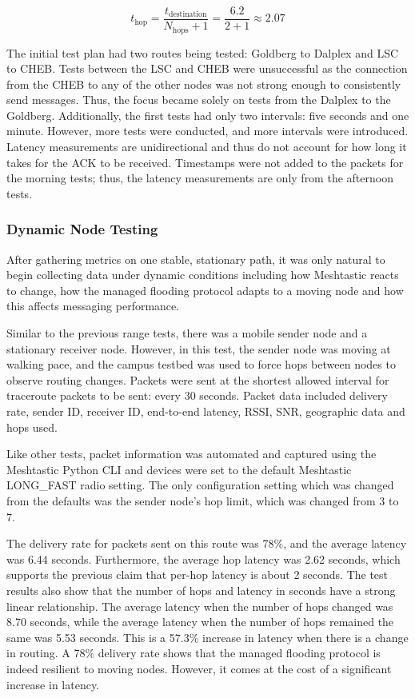 \documentclass[11pt]{article}
\begin{document}
\begin{equation}
    t_{\text{hop}} 
    = 
    \frac{t_{\text{destination}}}{N_\text{hops} + 1} 
    = 
    \frac{6.2}{2+1} 
    \approx 2.07
\end{equation}

The initial test plan had two routes being tested: Goldberg to Dalplex and LSC to CHEB. Tests between the LSC and CHEB were unsuccessful as the connection from the CHEB to any of the other nodes was not strong enough to consistently send messages. Thus, the focus became solely on tests from the Dalplex to the Goldberg. Additionally, the first tests had only two intervals: five seconds and one minute. However, more tests were conducted, and more intervals were introduced. Latency measurements are unidirectional and thus do not account for how long it takes for the ACK to be received. Timestamps were not added to the packets for the morning tests; thus, the latency measurements are only from the afternoon tests.

\FloatBarrier
\subsubsection{Dynamic Node Testing}

After gathering metrics on one stable, stationary path, it was only natural to begin collecting data under dynamic conditions including how Meshtastic reacts to change, how the managed flooding protocol adapts to a moving node and how this affects messaging performance. 

Similar to the previous range tests, there was a mobile sender node and a stationary receiver node. However, in this test, the sender node was moving at walking pace, and the campus testbed was used to force hops between nodes to observe routing changes. Packets were sent at the shortest allowed interval for traceroute packets to be sent: every 30 seconds. Packet data included delivery rate, sender ID, receiver ID, end-to-end latency, RSSI, SNR, geographic data and hops used. 

Like other tests, packet information was automated and captured using the Meshtastic Python CLI and devices were set to the default Meshtastic LONG\_FAST radio setting. The only configuration setting which was changed from the defaults was the sender node’s hop limit, which was changed from 3 to 7.

The delivery rate for packets sent on this route was 78\%, and the average latency was 6.44 seconds. Furthermore, the average hop latency was 2.62 seconds, which supports the previous claim that per-hop latency is about 2 seconds. The test results also show that the number of hops and latency in seconds have a strong linear relationship. The average latency when the number of hops changed was 8.70 seconds, while the average latency when the number of hops remained the same was 5.53 seconds. This is a 57.3\% increase in latency when there is a change in routing. A 78\% delivery rate shows that the managed flooding protocol is indeed resilient to moving nodes. However, it comes at the cost of a significant increase in latency.
\end{document}
